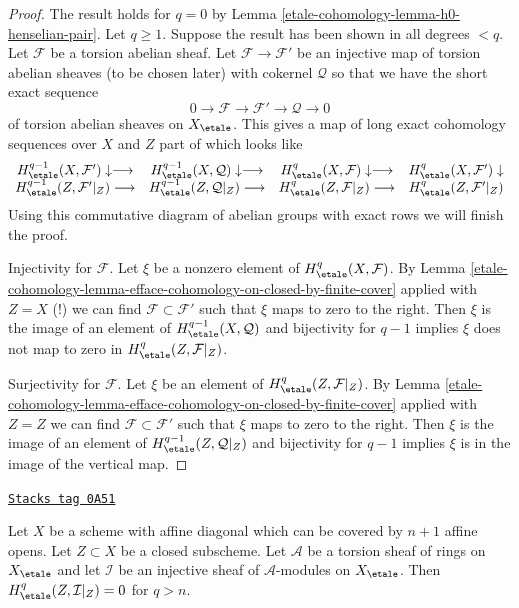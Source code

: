 \begin{proof}
The result holds for $q = 0$ by Lemma \ref{etale-cohomology-lemma-h0-henselian-pair}.
Let $q \geq 1$. Suppose the result has been shown in all degrees $< q$.
Let $\mathcal{F}$ be a torsion abelian sheaf. Let
$\mathcal{F} \to \mathcal{F}'$
be an injective map of torsion abelian sheaves (to be chosen later)
with cokernel $\mathcal{Q}$ so that we have the short exact sequence
$$
0 \to \mathcal{F} \to \mathcal{F}' \to \mathcal{Q} \to 0
$$
of torsion abelian sheaves on $X_\etale$. This gives a map of long exact
cohomology sequences over $X$ and $Z$ part of which looks like
$$
\begin{array}{cccc}H^{q - 1}_\etale(X, \mathcal{F}') \downarrow\longrightarrow & H^{q - 1}_\etale(X, \mathcal{Q}) \downarrow\longrightarrow & H^q_\etale(X, \mathcal{F}) \downarrow\longrightarrow & H^q_\etale(X, \mathcal{F}') \downarrow \\ H^{q - 1}_\etale(Z, \mathcal{F}'|_Z) \longrightarrow & H^{q - 1}_\etale(Z, \mathcal{Q}|_Z) \longrightarrow & H^q_\etale(Z, \mathcal{F}|_Z) \longrightarrow & H^q_\etale(Z, \mathcal{F}'|_Z)\end{array}
$$
Using this commutative diagram of abelian groups with exact rows
we will finish the proof.

\medskip\noindent
Injectivity for $\mathcal{F}$. Let $\xi$ be a nonzero element of
$H^q_\etale(X, \mathcal{F})$. By
Lemma \ref{etale-cohomology-lemma-efface-cohomology-on-closed-by-finite-cover} applied with
$Z = X$ (!) we can find $\mathcal{F} \subset \mathcal{F}'$ such that
$\xi$ maps to zero to the right. Then $\xi$ is the image of
an element of $H^{q - 1}_\etale(X, \mathcal{Q})$ and bijectivity
for $q - 1$ implies $\xi$ does not map to zero in
$H^q_\etale(Z, \mathcal{F}|_Z)$.

\medskip\noindent
Surjectivity for $\mathcal{F}$. Let $\xi$ be an element of
$H^q_\etale(Z, \mathcal{F}|_Z)$. By
Lemma \ref{etale-cohomology-lemma-efface-cohomology-on-closed-by-finite-cover} applied with
$Z = Z$ we can find $\mathcal{F} \subset \mathcal{F}'$ such that
$\xi$ maps to zero to the right. Then $\xi$ is the image of
an element of $H^{q - 1}_\etale(Z, \mathcal{Q}|_Z)$ and bijectivity
for $q - 1$ implies $\xi$ is in the image of the vertical map.
\end{proof}

\begin{lemma}
\label{etale-cohomology-lemma-vanishing-restriction-injective}
\href{https://stacks.math.columbia.edu/tag/0A51}{\texttt{Stacks tag 0A51}}

Let $X$ be a scheme with affine diagonal which can be covered by
$n + 1$ affine opens. Let $Z \subset X$ be a closed subscheme.
Let $\mathcal{A}$ be a torsion sheaf of rings on $X_\etale$
and let $\mathcal{I}$ be an injective sheaf of $\mathcal{A}$-modules
on $X_\etale$.
Then $H^q_\etale(Z, \mathcal{I}|_Z) = 0$ for $q > n$.
\end{lemma}

